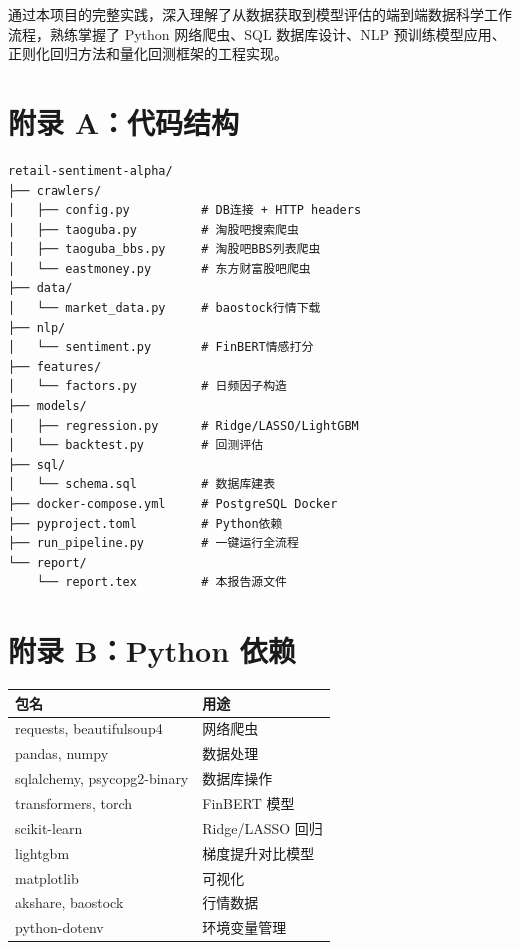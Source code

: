 \documentclass[12pt,a4paper]{ctexart}
\begin{document}
通过本项目的完整实践，深入理解了从数据获取到模型评估的端到端数据科学工作流程，熟练掌握了 Python 网络爬虫、SQL 数据库设计、NLP 预训练模型应用、正则化回归方法和量化回测框架的工程实现。

\newpage

\section*{附录 A：代码结构}

\begin{lstlisting}[caption={项目文件结构}]
retail-sentiment-alpha/
├── crawlers/
│   ├── config.py          # DB连接 + HTTP headers
│   ├── taoguba.py         # 淘股吧搜索爬虫
│   ├── taoguba_bbs.py     # 淘股吧BBS列表爬虫
│   └── eastmoney.py       # 东方财富股吧爬虫
├── data/
│   └── market_data.py     # baostock行情下载
├── nlp/
│   └── sentiment.py       # FinBERT情感打分
├── features/
│   └── factors.py         # 日频因子构造
├── models/
│   ├── regression.py      # Ridge/LASSO/LightGBM
│   └── backtest.py        # 回测评估
├── sql/
│   └── schema.sql         # 数据库建表
├── docker-compose.yml     # PostgreSQL Docker
├── pyproject.toml         # Python依赖
├── run_pipeline.py        # 一键运行全流程
└── report/
    └── report.tex         # 本报告源文件
\end{lstlisting}

\section*{附录 B：Python 依赖}

\begin{table}[H]
    \centering
    \begin{tabular}{@{}ll@{}}
        \toprule
        \textbf{包名} & \textbf{用途} \\
        \midrule
        requests, beautifulsoup4 & 网络爬虫 \\
        pandas, numpy & 数据处理 \\
        sqlalchemy, psycopg2-binary & 数据库操作 \\
        transformers, torch & FinBERT 模型 \\
        scikit-learn & Ridge/LASSO 回归 \\
        lightgbm & 梯度提升对比模型 \\
        matplotlib & 可视化 \\
        akshare, baostock & 行情数据 \\
        python-dotenv & 环境变量管理 \\
        \bottomrule
    \end{tabular}
\end{table}
\end{document}
